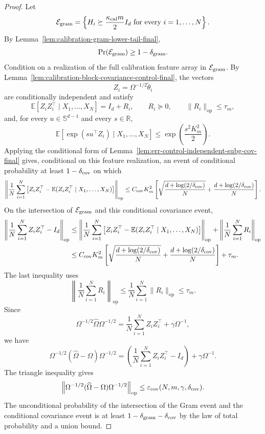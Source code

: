 \documentclass{article} %
\begin{document}
\begin{proof}
Let
\[
\mathcal{E}_{\rm gram}
=
\left\{
H_i\succeq \frac{\kappa_{\rm cal}m}{2}I_d
\text{ for every }i=1,\ldots,N
\right\}.
\]
By Lemma~\ref{lem:calibration-gram-lower-tail-final},
\[
\Pr(\mathcal{E}_{\rm gram})\ge 1-\delta_{\rm gram}.
\]
Condition on a realization of the full calibration feature array in
\(\mathcal{E}_{\rm gram}\).  By
Lemma~\ref{lem:calibration-block-covariance-control-final}, the vectors
\[
Z_i=\Omega^{-1/2}\widetilde\theta_i
\]
are conditionally independent and satisfy
\[
\mathbb{E}[Z_iZ_i^\top\mid X_1,\ldots,X_N]=I_d+R_i,
\qquad
R_i\succeq0,
\qquad
\|R_i\|_{\mathrm{op}}\le \tau_m,
\]
and, for every \(u\in\mathbb{S}^{d-1}\) and every \(s\in\mathbb{R}\),
\[
\mathbb{E}\!\left[
\exp(su^\top Z_i)\mid X_1,\ldots,X_N
\right]
\le
\exp\!\left(\frac{s^2K_m^2}{2}\right).
\]
Applying the conditional form of
Lemma~\ref{lem:err-control-independent-subg-cov-final} gives, conditional on
this feature realization, an event of conditional probability at least
\(1-\delta_{\rm cov}\) on which
\[
\left\|
\frac1N\sum_{i=1}^N
\left[
Z_iZ_i^\top-\mathbb{E}(Z_iZ_i^\top\mid X_1,\ldots,X_N)
\right]
\right\|_{\mathrm{op}}
\le
C_{\rm cov}K_m^2
\left[
\sqrt{\frac{d+\log(2/\delta_{\rm cov})}{N}}
+
\frac{d+\log(2/\delta_{\rm cov})}{N}
\right].
\]
On the intersection of \(\mathcal{E}_{\rm gram}\) and this conditional
covariance event,
\[
\begin{aligned}
\left\|
\frac1N\sum_{i=1}^N Z_iZ_i^\top-I_d
\right\|_{\mathrm{op}}
&\le
\left\|
\frac1N\sum_{i=1}^N
\left[
Z_iZ_i^\top-\mathbb{E}(Z_iZ_i^\top\mid X_1,\ldots,X_N)
\right]
\right\|_{\mathrm{op}}
+
\left\|\frac1N\sum_{i=1}^N R_i\right\|_{\mathrm{op}}
\\
&\le
C_{\rm cov}K_m^2
\left[
\sqrt{\frac{d+\log(2/\delta_{\rm cov})}{N}}
+
\frac{d+\log(2/\delta_{\rm cov})}{N}
\right]
+\tau_m.
\end{aligned}
\]
The last inequality uses
\[
\left\|\frac1N\sum_{i=1}^N R_i\right\|_{\mathrm{op}}
\le
\frac1N\sum_{i=1}^N\|R_i\|_{\mathrm{op}}
\le
\tau_m.
\]
Since
\[
\Omega^{-1/2}\widehat\Omega\Omega^{-1/2}
=
\frac1N\sum_{i=1}^N Z_iZ_i^\top+\gamma\Omega^{-1},
\]
we have
\[
\Omega^{-1/2}(\widehat\Omega-\Omega)\Omega^{-1/2}
=
\left(\frac1N\sum_{i=1}^N Z_iZ_i^\top-I_d\right)+\gamma\Omega^{-1}.
\]
The triangle inequality gives
\[
\left\|
\Omega^{-1/2}(\widehat\Omega-\Omega)\Omega^{-1/2}
\right\|_{\mathrm{op}}
\le
\varepsilon_{\rm cov}(N,m,\gamma,\delta_{\rm cov}).
\]
The unconditional probability of the intersection of the Gram event and the
conditional covariance event is at least
\(1-\delta_{\rm gram}-\delta_{\rm cov}\) by the law of total probability and a
union bound.
\end{proof}
\end{document}

